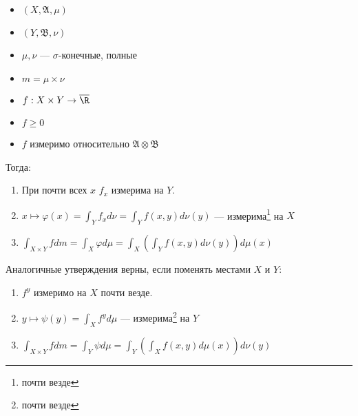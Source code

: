 \begin{theorem}[Тонелли]\itemfix
    \label{тонелли}
    \begin{itemize}
        \item \((X, \mathfrak{A}, \mu)\)
        \item \((Y, \mathfrak{B}, \nu)\)
        \item \(\mu, \nu\) --- \(\sigma\)-конечные, полные
        \item \(m = \mu \times \nu\)
        \item \(f : X \times Y \to \overline \R\)
        \item \(f \geq 0\)
        \item \(f\) измеримо относительно \(\mathfrak{A} \otimes \mathfrak{B}\)
    \end{itemize}

    Тогда:
    \begin{enumerate}
        \item При почти всех \(x\) \(f_x\) измерима на \(Y\).
        \item \(x \mapsto \varphi(x) = \int_Y f_x d \nu = \int_Y f(x, y) d \nu(y)\) --- измерима\footnote{почти везде} на \(X\)
        \item \(\int_{X \times Y} f dm = \int_X \varphi d\mu = \int_X \left( \int_Y f(x, y) d \nu(y) \right) d\mu(x)\)
    \end{enumerate}

    Аналогичные утверждения верны, если поменять местами \(X\) и \(Y\):
    \begin{enumerate}
        \item \(f^y\) измеримо на \(X\) почти везде.
        \item \(y \mapsto \psi(y) = \int_X f^y d\mu\) --- измерима\footnote{почти везде} на \(Y\)
        \item \(\int_{X \times Y} f dm = \int_Y \psi d\mu = \int_Y \left( \int_X f(x, y) d \mu(x) \right) d\nu(y)\)
    \end{enumerate}
\end{theorem}

